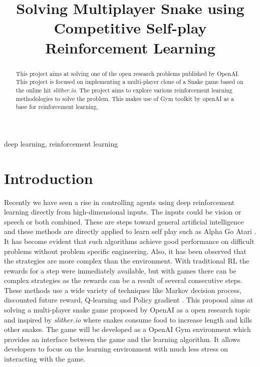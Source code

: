\documentclass[conference,10pt]{IEEEtran}
\begin{document}
	\title{Solving Multiplayer Snake using Competitive Self-play Reinforcement Learning}

	\author{
		\and
		\and
	}

	\maketitle

	\begin{abstract}
		This project aims at solving one of the open research problems published by OpenAI\cite{n3}. This project is focused on implementing a multi-player clone of a Snake game based on the online hit \textit{slither.io}. The project aims to explore various reinforcement learning methodologies to solve the problem. This makes use of Gym toolkit by openAI as a base for reinforcement learning.
	\end{abstract}

	\begin{IEEEkeywords}
		deep learning, reinforcement learning
	\end{IEEEkeywords}

	\section{Introduction}
	Recently we have seen a rise in controlling agents using deep reinforcement learning directly from high-dimensional inputs. The inputs could be vision or speech or both combined. These are steps toward
	general artificial intelligence and these methods are directly applied to
	learn self play such as Alpha Go \cite{sp9} Atari \cite{sp3}. It has become
	evident that such algorithms achieve good performance on difficult problems
	without problem specific engineering. Also, it has been observed that the
	strategies are more complex than the environment. With traditional RL the
	rewards for a step were immediately available, but with games there can be
	complex strategies as the rewards can be a result of several consecutive steps.
	These methods use a wide variety of techniques like Markov decision process,
	discounted future reward, Q-learning \cite{sd5} and Policy gradient \cite{sd4}.\break
	This proposal aims at solving a multi-player snake game proposed by OpenAI as a open research topic and inspired by
	\textit{slither.io} \cite{sd2} where snakes consume food to increase length and
	kills other snakes. The game will be developed as a
	OpenAI Gym \cite{sd2} environment which provides an interface between the game
	and the learning algorithm. It allows developers to focus on the learning
	environment with much less stress on interacting with the game.
\end{document}
